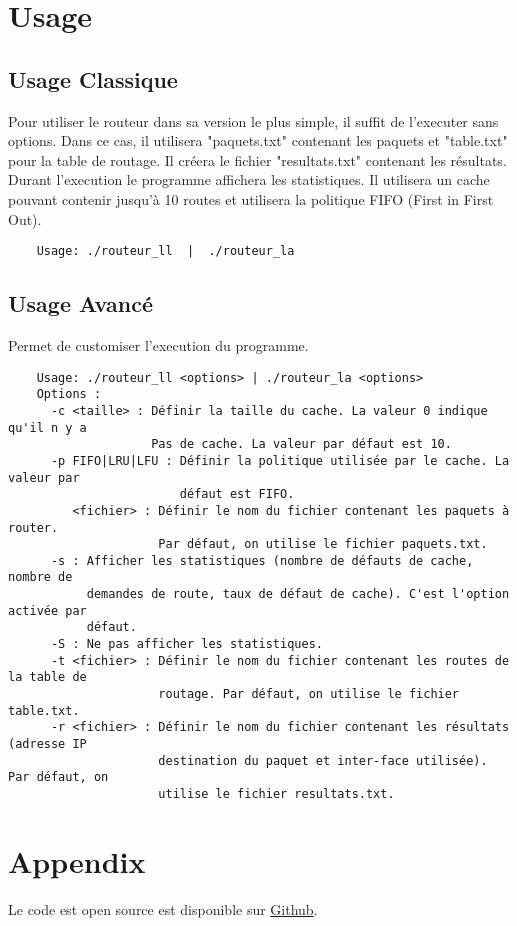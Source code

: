 \documentclass{article}
\begin{document}
\section{Usage}
\subsection{Usage Classique}
Pour utiliser le routeur dans sa version le plus simple, il suffit de l'executer sans options. Dans ce cas, il utilisera "paquets.txt" contenant les paquets et "table.txt" pour la table de routage. Il créera le fichier "resultats.txt" contenant les résultats. Durant l'execution le programme affichera les statistiques. Il utilisera un cache pouvant contenir jusqu'à 10 routes et utilisera la politique FIFO (First in First Out). 
\begin{verbatim}
    Usage: ./routeur_ll  |  ./routeur_la
\end{verbatim}

\subsection{Usage Avancé}
Permet de customiser l'execution du programme.
\begin{verbatim}
    Usage: ./routeur_ll <options> | ./routeur_la <options>
    Options :
      -c <taille> : Définir la taille du cache. La valeur 0 indique qu'il n y a 
                    Pas de cache. La valeur par défaut est 10.
      -p FIFO|LRU|LFU : Définir la politique utilisée par le cache. La valeur par 
                        défaut est FIFO.
         <fichier> : Définir le nom du fichier contenant les paquets à router. 
                     Par défaut, on utilise le fichier paquets.txt.
      -s : Afficher les statistiques (nombre de défauts de cache, nombre de 
           demandes de route, taux de défaut de cache). C'est l'option activée par 
           défaut.
      -S : Ne pas afficher les statistiques.
      -t <fichier> : Définir le nom du fichier contenant les routes de la table de 
                     routage. Par défaut, on utilise le fichier table.txt.
      -r <fichier> : Définir le nom du fichier contenant les résultats (adresse IP 
                     destination du paquet et inter-face utilisée). Par défaut, on 
                     utilise le fichier resultats.txt.
\end{verbatim}

\section{Appendix}
Le code est open source est disponible sur \href{http://www.github.com/Absobel/PIM_Project}{Github}.
\end{document}
